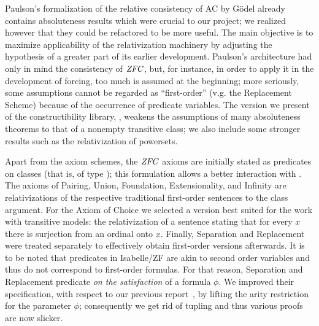 Paulson's formalization \cite{paulson_2003} of the relative
consistency of AC by Gödel \cite{godel-L} already contains
absoluteness results which were crucial to our project; we realized
however that they could be refactored to be more useful. The main
objective is to maximize applicability of the relativization machinery
by adjusting the hypothesis of a greater part of its earlier
development. Paulson's architecture had only in mind the consistency
of $\mathit{ZFC}$, but, for instance, in order to apply it in the development
of forcing, too much is assumed at the beginning; more seriously, some
assumptions cannot be regarded as ``first-order'' (v.g. the
Replacement Scheme) because of the occurrence of predicate variables.
The version we present of the constructibility library,
, weakens the assumptions of many
absoluteness theorems to that of a nonempty transitive class; we also
include some stronger results such as the relativization of powersets.

Apart from the axiom schemes, the $\mathit{ZFC}$ axioms are initially stated
as predicates on classes (that is, of type
); this formulation
allows a better interaction with .  The axioms
of Pairing, Union, Foundation, Extensionality, and Infinity are
relativizations of the respective traditional first-order sentences to
the class argument. For the Axiom of Choice we selected a version best
suited for the work with transitive models: the relativization of a
sentence stating that for every $x$ there is surjection from an
ordinal onto $x$. Finally, Separation and Replacement were treated
separately to effectively obtain first-order versions afterwards. It
is to be noted that predicates in Isabelle/ZF are akin to second order
variables and thus do not correspond to first-order formulas.
For that reason, Separation and Replacement predicate \emph{on the
  satisfaction} of a formula $\phi$.  We improved their specification,
with respect to our previous report~\cite{2019arXiv190103313G}, by lifting
the arity restriction for the parameter $\phi$; consequently we
get rid of tupling and thus various proofs are now slicker.

